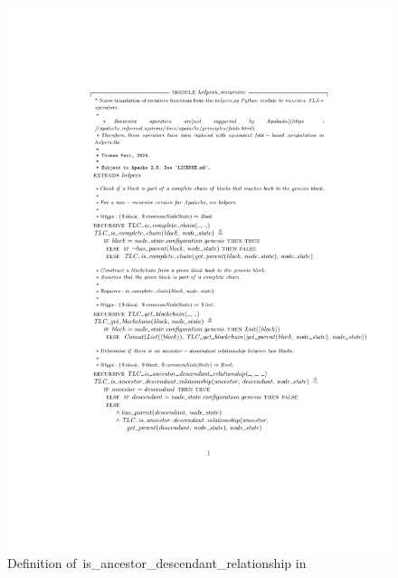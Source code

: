 \begin{figure}
  \includegraphics[width=\textwidth]{images/ancestor_descendant.pdf}
  \caption{Definition
    of~\textsf{is\_ancestor\_descendant\_relationship} in \tlap{}}\label{tla_adr}
\end{figure}

